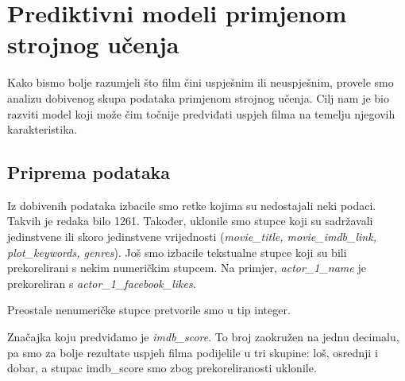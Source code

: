 

\lstset{style=mystyle}


\chapter{Prediktivni modeli primjenom strojnog učenja}

Kako bismo bolje razumjeli što film čini uspješnim ili neuspješnim, provele smo analizu dobivenog skupa podataka primjenom strojnog učenja. Cilj nam je bio razviti model koji može čim točnije predviđati uspjeh filma na temelju njegovih karakteristika.
\\
\section{Priprema podataka}
Iz dobivenih podataka izbacile smo retke kojima su nedostajali neki podaci. Takvih je redaka bilo 1261. Također, uklonile smo stupce koji su sadržavali jedinstvene ili skoro jedinstvene vrijednosti (\textit{movie\_title, movie\_imdb\_link, plot\_keywords, genres}). Još smo izbacile tekstualne stupce koji su bili prekorelirani s nekim numeričkim stupcem. Na primjer, \textit{actor\_1\_name} je prekoreliran s \textit{actor\_1\_facebook\_likes}. 

 
Preostale nenumeričke stupce pretvorile smo u tip integer. 



Značajka koju predviđamo je \textit{imdb\_score}. To broj zaokružen na jednu decimalu, pa smo za bolje rezultate uspjeh filma podijelile u tri skupine: loš, osrednji i dobar, a stupac imdb\_score smo zbog prekoreliranosti uklonile. 



